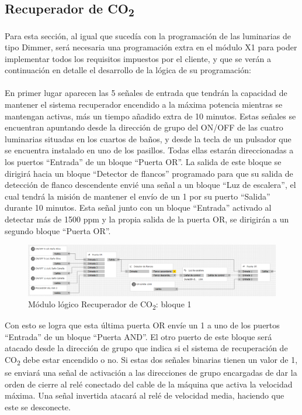\subsection{Recuperador de CO\textsubscript{2}}
Para esta sección, al igual que sucedía con la programación de las luminarias de tipo Dimmer, será necesaria una programación extra en el módulo X1 para poder implementar todos los requisitos impuestos por el cliente, y que se verán a continuación en detalle el desarrollo de la lógica de su programación:\\\\
En primer lugar aparecen las 5 señales de entrada que tendrán la capacidad de mantener el sistema recuperador encendido a la máxima potencia mientras se mantengan activas, más un tiempo añadido extra de 10 minutos. Estas señales se encuentran apuntando desde la dirección de grupo del ON/OFF de las cuatro luminarias situadas en los cuartos de baños, y desde la tecla de un pulsador que se encuentra instalado en uno de los pasillos. Todas ellas estarán direccionadas a los puertos “Entrada” de un bloque “Puerta OR”. La salida de este bloque se dirigirá hacia un bloque “Detector de flancos” programado para que su salida de detección de flanco descendente envié una señal a un bloque “Luz de escalera”, el cual tendrá la misión de mantener el envío de un 1 por su puerto “Salida” durante 10 minutos. Esta señal junto con un bloque “Entrada” activado al detectar más de 1500 ppm y la propia salida de la puerta OR, se dirigirán a un segundo bloque “Puerta OR”.
\begin{figure}[H]
\centering
\includegraphics[width=1\textwidth]{figures/log_co2_b1.png}   
\caption{Módulo lógico Recuperador de CO\textsubscript{2}: bloque 1}
\label{fig:log_co2_b1}
\end{figure}
Con esto se logra que esta última puerta OR envíe un 1 a uno de los puertos “Entrada” de un bloque “Puerta AND”. El otro puerto de este bloque será atacado desde la dirección de grupo que indica si el sistema de recuperación de CO\textsubscript{2} debe estar encendido o no. Si estas dos señales binarias tienen un valor de 1, se enviará una señal de activación a las direcciones de grupo encargadas de dar la orden de cierre al relé conectado del cable de la máquina que activa la velocidad máxima. Una señal invertida atacará al relé de velocidad media, haciendo que este se desconecte.

